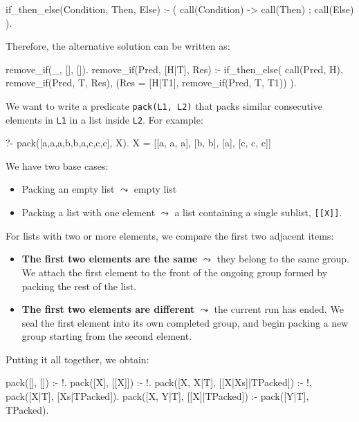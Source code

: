\begin{example}{}
\begin{codeblock}
if_then_else(Condition, Then, Else) :-
    (   call(Condition)
    ->  call(Then)
    ;   call(Else)
    ).
\end{codeblock}
\end{example}

Therefore, the alternative solution can be written as:

\begin{codeblock}
remove_if(_, [], []).
remove_if(Pred, [H|T], Res) :-
    if_then_else(
        call(Pred, H),                              
        remove_if(Pred, T, Res),                  
        (Res = [H|T1], remove_if(Pred, T, T1)) 
    ).
\end{codeblock}

We want to write a predicate \texttt{pack(L1, L2)} that packs similar consecutive elements in \texttt{L1} in a list inside \texttt{L2}. For example:

\begin{codeblock}
?- pack([a,a,a,b,b,a,c,c,c], X).
X = [[a, a, a], [b, b], [a], [c, c, c]]
\end{codeblock}

We have two base cases:
\begin{itemize}
    \item Packing an empty list $\leadsto$ empty list 
    \item Packing a list with one element $\leadsto$ a list containing a single sublist, \texttt{[[X]]}.
\end{itemize}

For lists with two or more elements, we compare the first two adjacent items:
\begin{itemize}
    \item \textbf{The first two elements are the same} $\leadsto$ they belong to the same group. We attach the first element to the front of the ongoing group formed by packing the rest of the list.
    \item \textbf{The first two elements are different} $\leadsto$ the current run has ended. We seal the first element into its own completed group, and begin packing a new group starting from the second element.
\end{itemize}
Putting it all together, we obtain:

\begin{codeblock}
pack([], []) :- !.
pack([X], [[X]]) :- !.
pack([X, X|T], [[X|Xs]|TPacked]) :- !,
    pack([X|T], [Xs|TPacked]).
pack([X, Y|T], [[X]|TPacked]) :-
    pack([Y|T], TPacked).
\end{codeblock}


